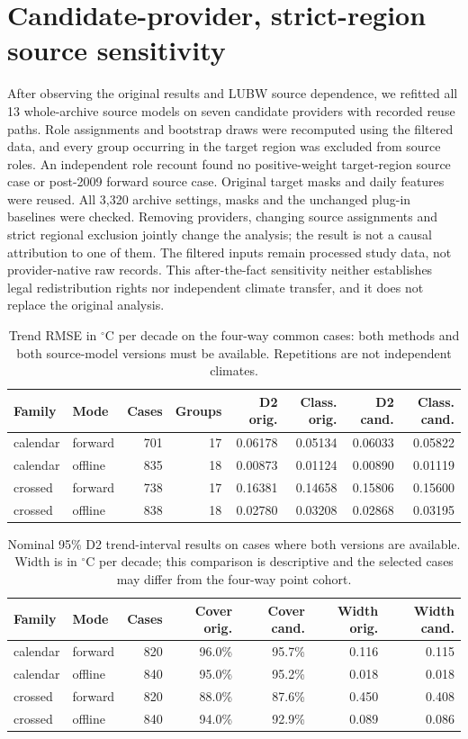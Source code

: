 \section{Candidate-provider, strict-region source sensitivity}
After observing the original results and LUBW source dependence, we refitted all 13 whole-archive source models on seven candidate providers with recorded reuse paths. Role assignments and bootstrap draws were recomputed using the filtered data, and every group occurring in the target region was excluded from source roles. An independent role recount found no positive-weight target-region source case or post-2009 forward source case. Original target masks and daily features were reused. All 3,320 archive settings, masks and the unchanged plug-in baselines were checked. Removing providers, changing source assignments and strict regional exclusion jointly change the analysis; the result is not a causal attribution to one of them. The filtered inputs remain processed study data, not provider-native raw records. This after-the-fact sensitivity neither establishes legal redistribution rights nor independent climate transfer, and it does not replace the original analysis.
\begin{table}[p]\centering\footnotesize
\caption{Trend RMSE in $^{\circ}$C per decade on the four-way common cases: both methods and both source-model versions must be available. Repetitions are not independent climates.}\label{tab:source-filter-comparison}
\begin{tabular}{llrrrrrr}\toprule
Family & Mode & Cases & Groups & D2 orig. & Class. orig. & D2 cand. & Class. cand.\\\midrule
calendar & forward & 701 & 17 & 0.06178 & 0.05134 & 0.06033 & 0.05822\\
calendar & offline & 835 & 18 & 0.00873 & 0.01124 & 0.00890 & 0.01119\\
crossed & forward & 738 & 17 & 0.16381 & 0.14658 & 0.15806 & 0.15600\\
crossed & offline & 838 & 18 & 0.02780 & 0.03208 & 0.02868 & 0.03195\\
\bottomrule\end{tabular}
\end{table}
\begin{table}[p]\centering\footnotesize
\caption{Nominal 95\% D2 trend-interval results on cases where both versions are available. Width is in $^{\circ}$C per decade; this comparison is descriptive and the selected cases may differ from the four-way point cohort.}\label{tab:source-filter-coverage}
\begin{tabular}{llrrrrr}\toprule
Family & Mode & Cases & Cover orig. & Cover cand. & Width orig. & Width cand.\\\midrule
calendar & forward & 820 & 96.0\% & 95.7\% & 0.116 & 0.115\\
calendar & offline & 840 & 95.0\% & 95.2\% & 0.018 & 0.018\\
crossed & forward & 820 & 88.0\% & 87.6\% & 0.450 & 0.408\\
crossed & offline & 840 & 94.0\% & 92.9\% & 0.089 & 0.086\\
\bottomrule\end{tabular}
\end{table}
